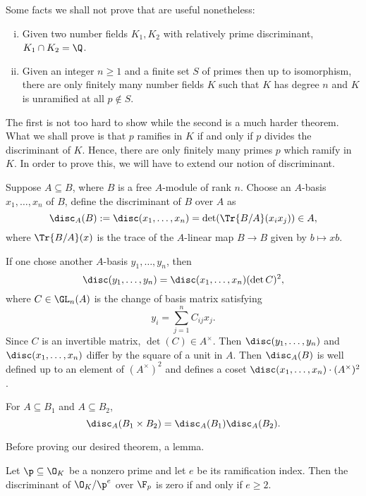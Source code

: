 Some facts we shall not prove that are useful nonetheless:

\begin{rem} \hfill
\begin{enumerate}[(i)]
\item Given two number fields $K_1,K_2$ with relatively prime discriminant, $K_1 \cap K_2 =\Q$.
\item Given an integer $n \geq 1$ and a finite set $S$ of primes then up to isomorphism, there are only finitely many number fields $K$ such that $K$ has degree $n$ and $K$ is unramified at all $p \notin S$. 
\end{enumerate}
\end{rem}

The first is not too hard to show while the second is a much harder theorem. What we shall prove is that $p$ ramifies in $K$ if and only if $p$ divides the discriminant of $K$. Hence, there are only finitely many primes $p$ which ramify in $K$. In order to prove this, we will have to extend our notion of discriminant. 

\begin{dfn}[Discriminant]
Suppose $A \subseteq B$, where $B$ is a free $A$-module of rank $n$. Choose an $A$-basis $x_1,\ldots,x_n$ of $B$, define the discriminant of $B$ over $A$ as
	\[
	\disc_A(B):=\disc(x_1,\ldots,x_n)= \det(\Tr{B/A}(x_ix_j)) \in A,
	\]
where $\Tr{B/A}(x)$ is the trace of the $A$-linear map $B \to B$ given by $b \mapsto xb$. 
\end{dfn}

If one chose another $A$-basis $y_1,\ldots,y_n$, then
	\[
	\disc(y_1,\ldots,y_n)=\disc(x_1,\ldots,x_n) (\det C)^2,
	\]
where $C \in \GL_n(A)$ is the change of basis matrix satisfying
	\[
	y_i = \sum_{j=1}^n C_{ij} x_j.
	\]
Since $C$ is an invertible matrix, $\det(C) \in A^\times$. Then $\disc(y_1,\ldots,y_n)$ and $\disc(x_1,\ldots,x_n)$ differ by the square of a unit in $A$. Then $\disc_A(B)$ is well defined up to an element of $(A^\times)^2$ and defines a coset $\disc(x_1,\ldots,x_n) \cdot (A^\times)^2$. 

\begin{prop}
For $A \subseteq B_1$ and $A \subseteq B_2$, 
	\[
	\disc_A(B_1 \times B_2)= \disc_A(B_1) \disc_A(B_2).
	\]
\end{prop}

Before proving our desired theorem, a lemma.

\begin{lem}\label{lem:ram}
Let $\p \subseteq \O_K$ be a nonzero prime and let $e$ be its ramification index. Then the discriminant of $\O_K/\p^e$ over $\F_p$ is zero if and only if $e \geq 2$. 
\end{lem}

